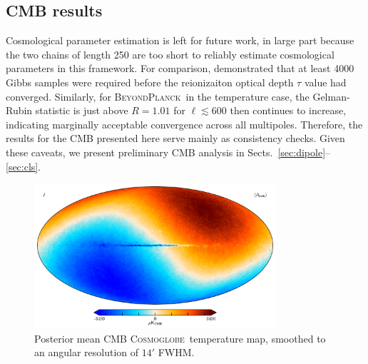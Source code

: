 \documentclass[twocolumn]{../../common/aa}
\newcommand{\bp}{\textsc{BeyondPlanck}}
\newcommand{\cosmoglobe}{\textsc{Cosmoglobe}}
\begin{document}



\subsection{CMB results}
\label{sec:cmb}

Cosmological parameter estimation is left for future work, in large part because the two chains of length 250 are too short to reliably estimate cosmological parameters in this framework. For comparison, \citet{bp12} demonstrated that at least 4000 Gibbs samples were required before the reionizaiton optical depth $\tau$ value had converged. Similarly, for \bp\ in the temperature case, the Gelman-Rubin statistic is just above $R=1.01$ for $\ell\lesssim600$ then continues to increase, indicating marginally acceptable convergence across all multipoles. Therefore, the results for the CMB presented here serve mainly as consistency checks. Given these caveats, we present preliminary CMB analysis in Sects.~\ref{sec:dipole}--\ref{sec:cls}.





\begin{figure}
	\centering
	\includegraphics[width=0.8\textwidth]{figures/cmb_I_dipole.pdf}
	\caption{Posterior mean CMB \cosmoglobe\ temperature map, smoothed to an angular resolution of $14'$ FWHM.}
\end{figure}
\end{document}
